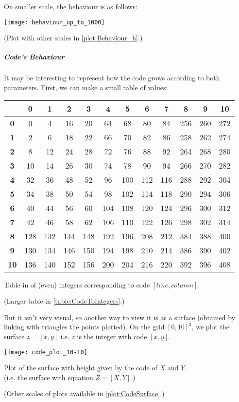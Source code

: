 On smaller scale, the behaviour is as follows:\\
\begin{center}
	\texttt{[image: behaviour\_up\_to\_1000]}
	
	(Plot with other scales in \ref{plot:Behaviour_h}.)
\end{center}

\subparagraph{Code's Behaviour}
It may be interesting to represent how the code grows according to both parameters.
First, we can make a small table of values:
\begin{center}
	\begin{tabular}{|c||c|c|c|c|c|c|c|c|c|c|c|}
		\hline
		\textbf{} & \textbf{0} & \textbf{1} & \textbf{2} & \textbf{3} & \textbf{4} & \textbf{5} & \textbf{6} & \textbf{7} & \textbf{8} & \textbf{9} & \textbf{10} \\\hline\hline
		\textbf{0} & 0 & 4 & 16 & 20 & 64 & 68 & 80 & 84 & 256 & 260 & 272 \\
		\textbf{1} & 2 & 6 & 18 & 22 & 66 & 70 & 82 & 86 & 258 & 262 & 274 \\
		\textbf{2} & 8 & 12 & 24 & 28 & 72 & 76 & 88 & 92 & 264 & 268 & 280 \\
		\textbf{3} & 10 & 14 & 26 & 30 & 74 & 78 & 90 & 94 & 266 & 270 & 282 \\
		\textbf{4} & 32 & 36 & 48 & 52 & 96 & 100 & 112 & 116 & 288 & 292 & 304 \\
		\textbf{5} & 34 & 38 & 50 & 54 & 98 & 102 & 114 & 118 & 290 & 294 & 306 \\
		\textbf{6} & 40 & 44 & 56 & 60 & 104 & 108 & 120 & 124 & 296 & 300 & 312 \\
		\textbf{7} & 42 & 46 & 58 & 62 & 106 & 110 & 122 & 126 & 298 & 302 & 314 \\
		\textbf{8} & 128 & 132 & 144 & 148 & 192 & 196 & 208 & 212 & 384 & 388 & 400 \\
		\textbf{9} & 130 & 134 & 146 & 150 & 194 & 198 & 210 & 214 & 386 & 390 & 402 \\
		\textbf{10} & 136 & 140 & 152 & 156 & 200 & 204 & 216 & 220 & 392 & 396 & 408 \\
		\hline
	\end{tabular}

	Table in of (even) integers corresponding to code $[line,column]$.
\end{center}
(Larger table in \ref{table:CodeToIntegers}.)

But it isn't very visual, so another way to view it is as a surface (obtained by linking with triangles the points plotted).
On the grid $\left[ 0,10 \right]^2$, we plot the surface $z = \left[ x, y \right]$ i.e. $z$ is the integer with code $\left[ x, y \right]$.
\begin{center}
	\texttt{[image: code\_plot\_10-10]}
	
	Plot of the surface with height given by the code of $X$ and $Y$.\\
	(i.e. the surface with equation $Z = [X,Y]$.)
\end{center}
(Other scales of plots available in \ref{plot:CodeSurface}.)

